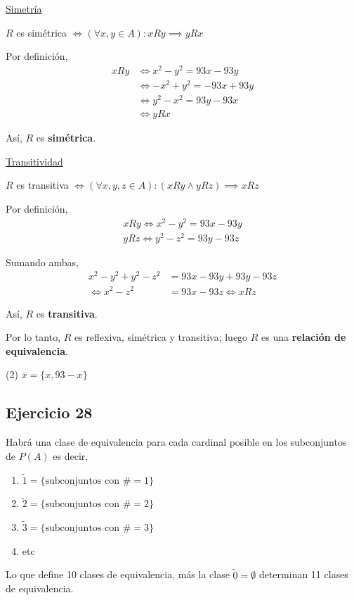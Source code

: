 \underline{Simetría}

$R$ es simétrica $\iff (\forall x, y \in A): xRy \implies yRx$

Por definición, 
\begin{align*}
    xRy &\iff x^2 - y^2 = 93x - 93y \\
    &\iff -x^2 + y^2 = -93x +93y \\
    &\iff y^2 -x^2 = 93y -93x \\
    &\iff yRx
\end{align*}

Así, $R$ es \textbf{simétrica}.

\underline{Transitividad}

$R$ es transitiva $\iff (\forall x, y, z \in A): (xRy \wedge yRz) \implies xRz$

Por definición,
\begin{align*}
    xRy \iff x^2 - y^2 = 93x - 93y \\
    yRz \iff y^2 - z^2 = 93y - 93z
\end{align*}

Sumando ambas,
\begin{align*}
    x^2 - y^2 + y^2 - z^2 &= 93x - 93y +93y - 93z \\
    \iff x^2 -z^2 &= 93x - 93z \iff xRz 
\end{align*}

Así, $R$ es \textbf{transitiva}.

Por lo tanto, $R$ es reflexiva, simétrica y transitiva; luego $R$ es una \textbf{relación de equivalencia}.

(2) $\overline{x} = \{ x, 93-x \}$

\subsection{Ejercicio 28}
Habrá una clase de equivalencia para cada cardinal posible en los subconjuntos de $P(A)$ es decir,
\begin{enumerate}[label=(\alph*)]
    \item $\tilde{1} = \{ \text{subconjuntos con }\#=1 \}$
    \item $\tilde{2} = \{ \text{subconjuntos con }\#=2 \}$
    \item $\tilde{3} = \{ \text{subconjuntos con }\#=3 \}$
    \item etc
\end{enumerate}

Lo que define 10 clases de equivalencia, más la clase $\tilde{0} = \emptyset$ determinan 11 clases de equivalencia.

